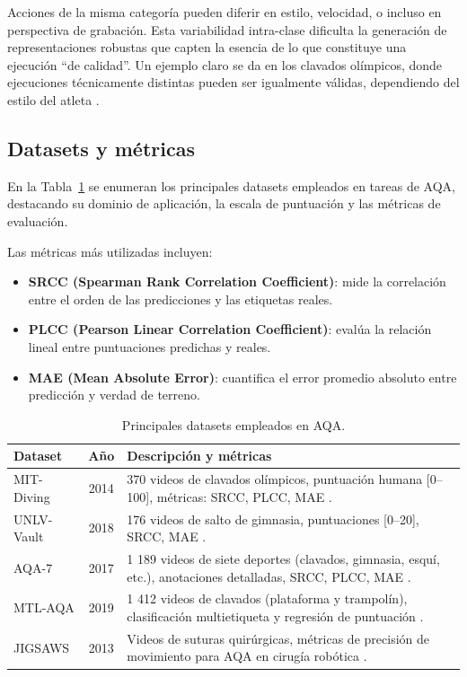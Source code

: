 Acciones de la misma categoría pueden diferir en estilo, velocidad, o incluso en perspectiva de grabación. Esta variabilidad intra-clase dificulta la generación de representaciones robustas que capten la esencia de lo que constituye una ejecución “de calidad”. Un ejemplo claro se da en los clavados olímpicos, donde ejecuciones técnicamente distintas pueden ser igualmente válidas, dependiendo del estilo del atleta \cite{Pirsiavash2014AssessedQuality,Yu2021GroupAware}.

\subsection{Datasets y métricas}

En la Tabla~\ref{tab:aqa_datasets} se enumeran los principales datasets empleados en tareas de \ac{AQA}, destacando su dominio de aplicación, la escala de puntuación y las métricas de evaluación.

Las métricas más utilizadas incluyen:

\begin{itemize}
    \item \textbf{SRCC (Spearman Rank Correlation Coefficient)}: mide la correlación entre el orden de las predicciones y las etiquetas reales.
    \item \textbf{PLCC (Pearson Linear Correlation Coefficient)}: evalúa la relación lineal entre puntuaciones predichas y reales.
    \item \textbf{MAE (Mean Absolute Error)}: cuantifica el error promedio absoluto entre predicción y verdad de terreno.
\end{itemize}

\begin{table}[ht]
    \centering
    \caption{Principales datasets empleados en \ac{AQA}.}
    \label{tab:aqa_datasets}
    \begin{tabular}{|l|c|p{8.5cm}|}
    \hline
    \textbf{Dataset} & \textbf{Año} & \textbf{Descripción y métricas} \\
    \hline
    MIT-Diving & 2014 & 370 videos de clavados olímpicos, puntuación humana [0–100], métricas: SRCC, PLCC, MAE \cite{Pirsiavash2014AssessedQuality}. \\
    \hline
    UNLV-Vault & 2018 & 176 videos de salto de gimnasia, puntuaciones [0–20], SRCC, MAE \cite{Wang2022AQASurvey}. \\
    \hline
    AQA-7 & 2017 & 1 189 videos de siete deportes (clavados, gimnasia, esquí, etc.), anotaciones detalladas, SRCC, PLCC, MAE \cite{Parmar2017AQA7}. \\
    \hline
    MTL-AQA & 2019 & 1 412 videos de clavados (plataforma y trampolín), clasificación multietiqueta y regresión de puntuación \cite{Parmar2019MTLAQA}. \\
    \hline
    JIGSAWS & 2013 & Videos de suturas quirúrgicas, métricas de precisión de movimiento para AQA en cirugía robótica \cite{DiPietro2013JIGSAWS}. \\
    \hline
    \end{tabular}
\end{table}

